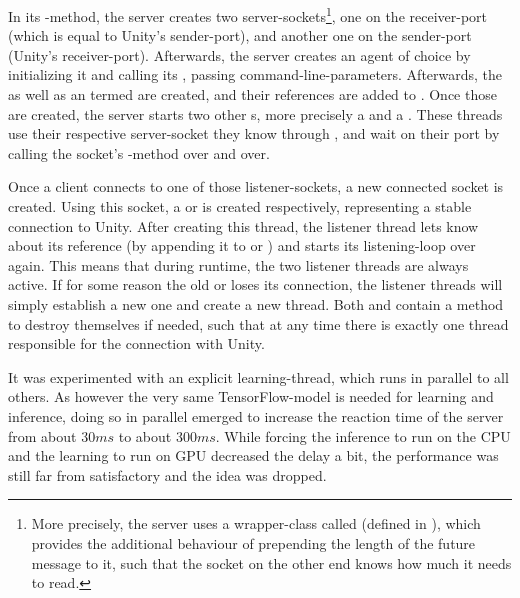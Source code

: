 In its -method, the server creates two server-sockets\footnote{More precisely, the server uses a wrapper-class called  (defined in ), which provides the additional behaviour of prepending the length of the future message to it, such that the socket on the other end knows how much it needs to read.}, one on the receiver-port (which is equal to Unity's sender-port), and another one on the sender-port (Unity's receiver-port). Afterwards, the server creates an agent of choice by initializing it and calling its , passing command-line-parameters. Afterwards, the   as well as an  termed  are created, and their references are added to . Once those are created, the server starts two other s, more precisely a  and a . These threads use their respective server-socket they know through , and wait on their port by calling the socket's -method over and over.

Once a client connects to one of those listener-sockets, a new connected socket is created. Using this socket, a  or  is created respectively, representing a stable connection to Unity. After creating this thread, the listener thread lets  know about its reference (by appending it to  or ) and starts its listening-loop over again. This means that during runtime, the two listener threads are always active. If for some reason the old  or  loses its connection, the listener threads will simply establish a new one and create a new thread. Both  and   contain a method to destroy themselves if needed, such that at any time there is exactly one thread responsible for the connection with Unity.

It was experimented with an explicit learning-thread, which runs in parallel to all others. As however the very same TensorFlow-model is needed for learning and inference, doing so in parallel emerged to increase the reaction time of the server from about $30ms$ to about $300ms$. While forcing the inference to run on the CPU and the learning to run on GPU decreased the delay a bit, the performance was still far from satisfactory and the idea was dropped.

